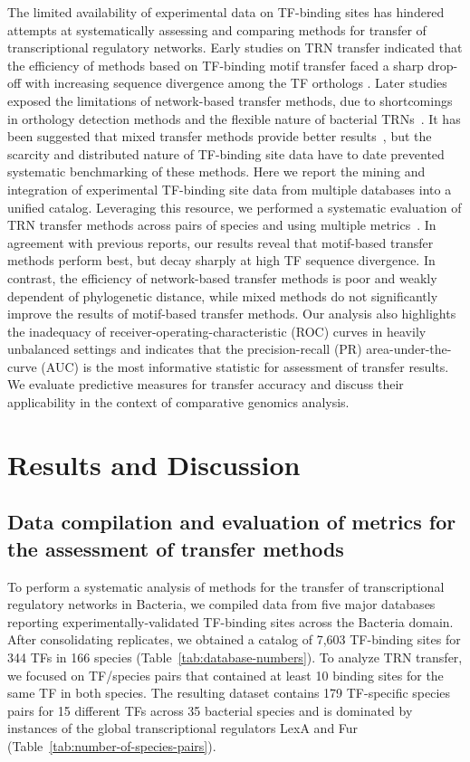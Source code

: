 The limited availability of experimental data on TF-binding sites has hindered
attempts at systematically assessing and comparing methods for transfer of
transcriptional regulatory networks. Early studies on TRN transfer indicated
that the efficiency of methods based on TF-binding motif transfer faced a sharp
drop-off with increasing sequence divergence among the TF orthologs
\citep{yu2004annotation}. Later studies exposed the limitations of
network-based transfer methods, due to shortcomings in orthology detection
methods and the flexible nature of bacterial TRNs~\citep{babu2006evolutionary,
  chavez2006bacterial, price2007orthologous}. It has been suggested that mixed
transfer methods provide better results~\citep{baumbach2010power}, but the
scarcity and distributed nature of TF-binding site data have to date prevented
systematic benchmarking of these methods. Here we report the mining and
integration of experimental TF-binding site data from multiple databases into a
unified catalog. Leveraging this resource, we performed a systematic evaluation
of TRN transfer methods across pairs of species and using multiple
metrics~\cite{kilic2015assessment}. In agreement with previous reports, our
results reveal that motif-based transfer methods perform best, but decay
sharply at high TF sequence divergence. In contrast, the efficiency of
network-based transfer methods is poor and weakly dependent of phylogenetic
distance, while mixed methods do not significantly improve the results of
motif-based transfer methods. Our analysis also highlights the inadequacy of
receiver-operating-characteristic (ROC) curves in heavily unbalanced settings
and indicates that the precision-recall (PR) area-under-the-curve (AUC) is the
most informative statistic for assessment of transfer results. We evaluate
predictive measures for transfer accuracy and discuss their applicability in
the context of comparative genomics analysis.


\section{Results and Discussion}

\subsection{Data compilation and evaluation of metrics for the assessment of
  transfer methods}

To perform a systematic analysis of methods for the transfer of transcriptional
regulatory networks in Bacteria, we compiled data from five major databases
reporting experimentally-validated TF-binding sites across the Bacteria
domain. After consolidating replicates, we obtained a catalog of 7,603
TF-binding sites for 344 TFs in 166 species
(Table~\ref{tab:database-numbers}). To analyze TRN transfer, we focused on
TF/species pairs that contained at least 10 binding sites for the same TF in
both species. The resulting dataset contains 179 TF-specific species pairs for
15 different TFs across 35 bacterial species and is dominated by instances of
the global transcriptional regulators LexA and Fur
(Table~\ref{tab:number-of-species-pairs}).

